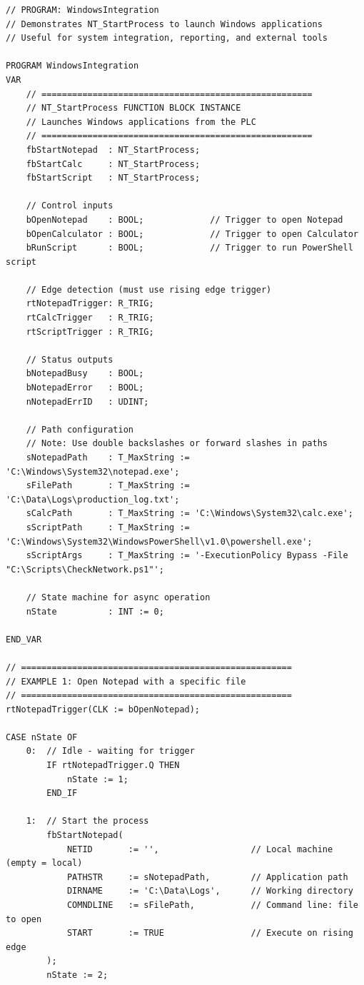 \documentclass[11pt,a4paper]{article}
\begin{document}
\begin{lstlisting}
// PROGRAM: WindowsIntegration
// Demonstrates NT_StartProcess to launch Windows applications
// Useful for system integration, reporting, and external tools

PROGRAM WindowsIntegration
VAR
    // =====================================================
    // NT_StartProcess FUNCTION BLOCK INSTANCE
    // Launches Windows applications from the PLC
    // =====================================================
    fbStartNotepad  : NT_StartProcess;
    fbStartCalc     : NT_StartProcess;
    fbStartScript   : NT_StartProcess;
    
    // Control inputs
    bOpenNotepad    : BOOL;             // Trigger to open Notepad
    bOpenCalculator : BOOL;             // Trigger to open Calculator
    bRunScript      : BOOL;             // Trigger to run PowerShell script
    
    // Edge detection (must use rising edge trigger)
    rtNotepadTrigger: R_TRIG;
    rtCalcTrigger   : R_TRIG;
    rtScriptTrigger : R_TRIG;
    
    // Status outputs
    bNotepadBusy    : BOOL;
    bNotepadError   : BOOL;
    nNotepadErrID   : UDINT;
    
    // Path configuration
    // Note: Use double backslashes or forward slashes in paths
    sNotepadPath    : T_MaxString := 'C:\Windows\System32\notepad.exe';
    sFilePath       : T_MaxString := 'C:\Data\Logs\production_log.txt';
    sCalcPath       : T_MaxString := 'C:\Windows\System32\calc.exe';
    sScriptPath     : T_MaxString := 'C:\Windows\System32\WindowsPowerShell\v1.0\powershell.exe';
    sScriptArgs     : T_MaxString := '-ExecutionPolicy Bypass -File "C:\Scripts\CheckNetwork.ps1"';
    
    // State machine for async operation
    nState          : INT := 0;
    
END_VAR

// =====================================================
// EXAMPLE 1: Open Notepad with a specific file
// =====================================================
rtNotepadTrigger(CLK := bOpenNotepad);

CASE nState OF
    0:  // Idle - waiting for trigger
        IF rtNotepadTrigger.Q THEN
            nState := 1;
        END_IF
        
    1:  // Start the process
        fbStartNotepad(
            NETID       := '',                  // Local machine (empty = local)
            PATHSTR     := sNotepadPath,        // Application path
            DIRNAME     := 'C:\Data\Logs',      // Working directory
            COMNDLINE   := sFilePath,           // Command line: file to open
            START       := TRUE                 // Execute on rising edge
        );
        nState := 2;
        

\end{lstlisting}
\end{document}
